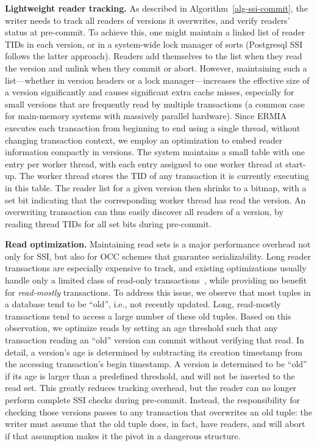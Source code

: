 {\bf Lightweight reader tracking.}
As described in Algorithm~\ref{alg-ssi-commit}, the writer needs to track all readers of versions it overwrites, and verify readers' status at pre-commit. To achieve this, one might maintain a linked list of reader TIDs in each version, or in a system-wide lock manager of sorts (Postgresql SSI follows the latter approach). Readers add themselves to the list when they read the version and unlink when they commit or abort. However, maintaining such a list---whether in version headers or a lock manager---increases the effective size of a version significantly and causes significant extra cache misses, especially for small versions that are frequently read by multiple transactions (a common case for main-memory systems with massively parallel hardware). Since ERMIA executes each transaction from beginning to end using a single thread, without changing transaction context, we employ an optimization to embed reader information compactly in versions. The system maintains a small table with one entry per worker thread, with each entry assigned to one worker thread at start-up. The worker thread stores the TID of any transaction it is currently executing in this table. The reader list for a given version then shrinks to a bitmap, with a set bit indicating that the corresponding worker thread has read the version. An overwriting transaction can thus easily discover all readers of a version, by reading thread TIDs for all set bits during pre-commit.

{\bf Read optimization.}
Maintaining read sets is a major performance overhead not only for SSI, but also for OCC schemes that guarantee serializability. Long reader transactions are especially expensive to track, and existing optimizations usually handle only a limited class of read-only transactions~\cite{PortsG12}, while providing no benefit for \textit{read-mostly} transactions. To address this issue, we observe that most tuples in a database tend to be ``old'', i.e., not recently updated. Long, read-mostly transactions tend to access a large number of these old tuples. Based on this observation, we optimize reads by setting an age threshold such that any transaction reading an ``old'' version can commit without verifying that read. In detail, a version's age is determined by subtracting its creation timestamp from the accessing transaction's begin timestamp. A version is determined to be ``old'' if its age is larger than a predefined threshold, and will not be inserted to the read set. This greatly reduces tracking overhead, but the reader can no longer perform complete SSI checks during pre-commit. Instead, the responsibility for checking those versions passes to any transaction that overwrites an old tuple: the writer must assume that the old tuple does, in fact, have readers, and will abort if that assumption makes it the pivot in a dangerous structure. 


